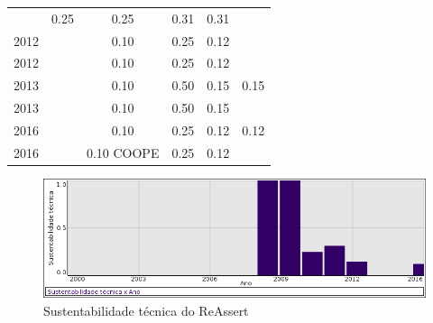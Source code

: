 \begin{table}[H]
\begin{tabular}{| l | c | c | c | c | c |}
          &
          0.25
          &
          0.25
          &
          0.31
          &
            {\color{red} 0.31}
          \\
            2012
          &
          
          &
          0.10
          &
          0.25
          &
          0.12
          &
          \\
            2012
          &
          
          &
          0.10
          &
          0.25
          &
          0.12
          &
          \\
\hline
            2013
          &
          
          &
          0.10
          &
          0.50
          &
          0.15
          &
            {\color{red} 0.15}
          \\
            2013
          &
          
          &
          0.10
          &
          0.50
          &
          0.15
          &
          \\
\hline
            2016
          &
          
          &
          0.10
          &
          0.25
          &
          0.12
          &
            {\color{red} 0.12}
          \\
            2016
          &
          
          &
          0.10
            {\tiny COOPE}
          &
          0.25
          &
          0.12
          &
          \\
\hline
\end{tabular}
\end{table}

\begin{figure}[h]
  \center
  \includegraphics[scale=0.50]{result-documents/charts/reassert.png}
  \caption{Sustentabilidade técnica do ReAssert}
\end{figure}


